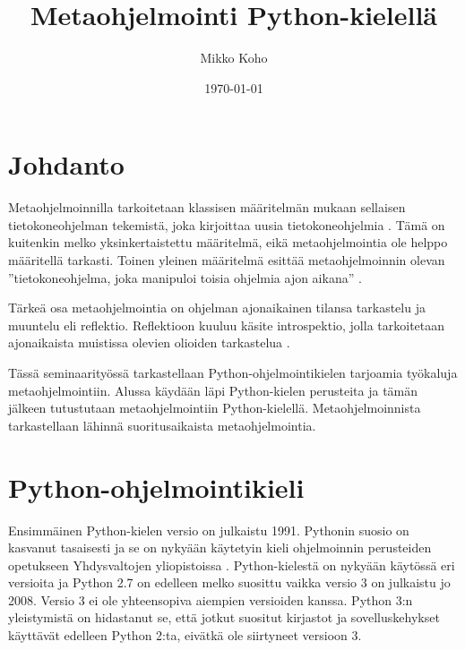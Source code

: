 \documentclass[finnish]{tktltiki2}
\title{Metaohjelmointi Python-kielellä}
\author{Mikko Koho}
\date{\today}
\theoremstyle{definition}
\theoremstyle{remark}
\begin{document}
    

\frontmatter      %

\maketitle        %

\makeabstract     %

\tableofcontents  %


\mainmatter       %


\section{Johdanto}

Metaohjelmoinnilla tarkoitetaan klassisen määritelmän mukaan sellaisen tietokoneohjelman tekemistä, joka kirjoittaa uusia tietokoneohjelmia \cite{hazzard2013}. Tämä on kuitenkin melko yksinkertaistettu määritelmä, eikä metaohjelmointia ole helppo määritellä tarkasti. Toinen yleinen määritelmä esittää metaohjelmoinnin olevan ''tietokoneohjelma, joka manipuloi toisia ohjelmia ajon aikana'' \cite{hazzard2013}. 

Tärkeä osa metaohjelmointia on ohjelman ajonaikainen tilansa tarkastelu ja muuntelu eli reflektio. Reflektioon kuuluu käsite introspektio, jolla tarkoitetaan ajonaikaista muistissa olevien olioiden tarkastelua \cite{dive-into-python}.

Tässä seminaarityössä tarkastellaan Python-ohjelmointikielen tarjoamia työkaluja metaohjelmointiin. Alussa käydään läpi Python-kielen perusteita ja tämän jälkeen tutustutaan metaohjelmointiin Python-kielellä. Metaohjelmoinnista tarkastellaan lähinnä suoritusaikaista metaohjelmointia. 



\section{Python-ohjelmointikieli}

Ensimmäinen Python-kielen versio on julkaistu 1991. Pythonin suosio on kasvanut tasaisesti ja se on nykyään käytetyin kieli ohjelmoinnin perusteiden opetukseen Yhdysvaltojen yliopistoissa \cite{python-teaching}. Python-kielestä on nykyään käytössä eri versioita ja Python 2.7 on edelleen melko suosittu vaikka versio 3 on julkaistu jo 2008. Versio 3 ei ole yhteensopiva aiempien versioiden kanssa. Python 3:n yleistymistä on hidastanut se, että jotkut suositut kirjastot ja sovelluskehykset käyttävät edelleen Python 2:ta, eivätkä ole siirtyneet versioon 3. 
\end{document}
